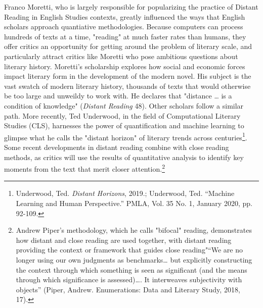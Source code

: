 \documentclass[11pt]{article}
\begin{document}
Franco Moretti, who is largely responsible for popularizing the
practice of Distant Reading in English Studies contexts, greatly
influenced the ways that English scholars approach quantiative
methodologies. Because computers can process hundreds of texts at a
time, "reading" at much faster rates than humans, they offer critics
an opportunity for getting around the problem of literary scale, and
particularly attract critics like Moretti who pose ambitious questions
about literary history. Moretti's scholarship explores how social and
economic forces impact literary form in the development of the modern
novel. His subject is the vast swatch of modern literary history,
thousands of texts that would otherwise be too large and unweildy to
work with. He declares that "distance \ldots{} is a condition of knowledge"
(\emph{Distant Reading} 48). Other scholars follow a similar path. More
recently, Ted Underwood, in the field of Computational Literary
Studies (CLS), harnesses the power of quantification and machine
learning to glimpse what he calls the "distant horizon" of literary
trends across centuries\footnote{Underwood, Ted. \emph{Distant Horizons}, 2019.; Underwood,
Ted. “Machine Learning and Human Perspective.” PMLA, Vol. 35 No. 1,
January 2020, pp. 92-109.}. Some recent developments in distant
reading combine with close reading methods, as critics will use the
results of quantitative analysis to identify key moments from the text
that merit closer attention.\footnote{Andrew Piper's methodology, which he calls "bifocal" reading,
demonstrates how distant and close reading are used together, with
distant reading providing the context or framework that guides close
reading"“We are no longer using our own judgments as benchmarks\ldots{} but
explicitly constructing the context through which something is seen as
significant (and the means through which significance is
assessed)\ldots{}. It interweaves subjectivity with objects” (Piper,
Andrew. Enumerations: Data and Literary Study, 2018, 17).}
\end{document}
